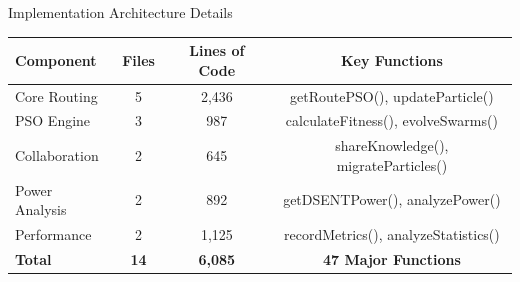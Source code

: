 \documentclass[10pt,aspectratio=169]{beamer}
\begin{document}
\begin{frame}{Implementation Architecture Details}
\begin{figure}
    \end{figure}
    
    \begin{table}[h]
        \centering
        \footnotesize
        \begin{tabular}{|l|c|c|c|}
            \hline
            \textbf{Component} & \textbf{Files} & \textbf{Lines of Code} & \textbf{Key Functions} \\
            \hline
            Core Routing & 5 & 2,436 & getRoutePSO(), updateParticle() \\
            PSO Engine & 3 & 987 & calculateFitness(), evolveSwarms() \\
            Collaboration & 2 & 645 & shareKnowledge(), migrateParticles() \\
            Power Analysis & 2 & 892 & getDSENTPower(), analyzePower() \\
            Performance & 2 & 1,125 & recordMetrics(), analyzeStatistics() \\
            \hline
            \textbf{Total} & \textbf{14} & \textbf{6,085} & \textbf{47 Major Functions} \\
            \hline
        \end{tabular}
    \end{table}
\end{frame}
\end{document}
